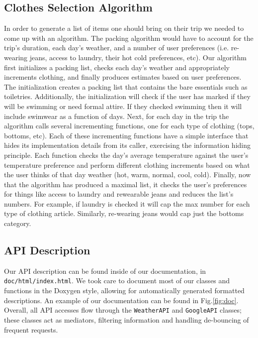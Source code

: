 \documentclass[11pt]{article}
\begin{document}
    \subsection{Clothes Selection Algorithm}
    In order to generate a list of items one should bring on their trip we needed to come up with an algorithm. The packing algorithm would have to account for the trip's duration, each day's weather, and a number of user preferences (i.e. re-wearing jeans, access to laundry, their hot cold preferences, etc). Our algorithm first initializes a packing list, checks each day's weather and appropriately increments clothing, and finally produces estimates based on user preferences. The initialization creates a packing list that contains the bare essentials such as toiletries. Additionally, the initialization will check if the user has marked if they will be swimming or need formal attire. If they checked swimming then it will include swimwear as a function of days. Next, for each day in the trip the algorithm calls several incrementing functions, one for each type of clothing (tops, bottoms, etc). Each of these incrementing functions have a simple interface that hides its implementation details from its caller, exercising the information hiding principle. Each function checks the day's average temperature against the user's temperature preference and perform different clothing increments based on what the user thinks of that day weather (hot, warm, normal, cool, cold). Finally, now that the algorithm has produced a maximal list, it checks the user's preferences for things like access to laundry and rewearable jeans and reduces the list's numbers. For example, if laundry is checked it will cap the max number for each type of clothing article. Similarly, re-wearing jeans would cap just the bottoms category. 

    \subsection{API Description}
    Our API description can be found inside of our documentation, in \texttt{doc/html/index.html}. We took care to document most of our classes and functions in the Doxygen style, allowing for automatically generated formatted descriptions. An example of our documentation can be found in Fig.\ref{fig:doc}. Overall, all API accesses flow through the \texttt{WeatherAPI} and \texttt{GoogleAPI} classes; these classes act as mediators, filtering information and handling de-bouncing of frequent requests. 
\end{document}
